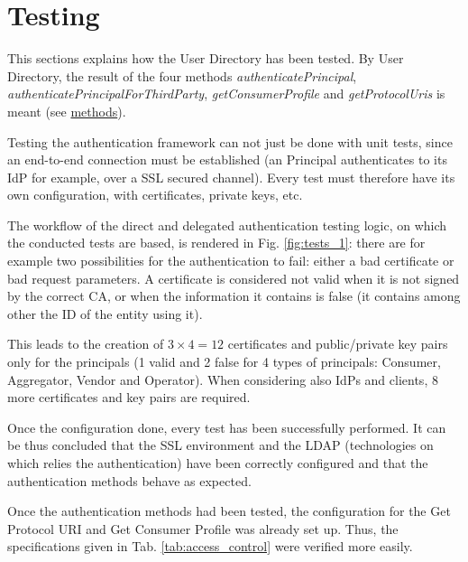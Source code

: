\section{Testing}
This sections explains how the User Directory has been tested. By User Directory, the result of the four methods \textit{authenticatePrincipal}, \textit{authenticatePrincipalForThirdParty}, \textit{getConsumerProfile} and \textit{getProtocolUris} is meant (see \hyperref[interface_methods]{methods}).

Testing the authentication framework can not just be done with unit tests, since an end-to-end connection must be established (an Principal authenticates to its IdP for example, over a SSL secured channel). Every test must therefore have its own configuration, with certificates, private keys, etc.

The workflow of the direct and delegated authentication testing logic, on which the conducted tests are based, is rendered in Fig. \ref{fig:tests_1}: there are for example two possibilities for the authentication to fail: either a bad certificate or bad request parameters. A certificate is considered not valid when it is not signed by the correct CA, or when the information it contains is false (it contains among other the ID of the entity using it). 

This leads to the creation of $ 3 \times 4 = 12 $ certificates and public/private key pairs only for the principals (1 valid and 2 false for 4 types of principals: Consumer, Aggregator, Vendor and Operator). When considering also IdPs and clients, 8 more certificates and key pairs are required. 

Once the configuration done, every test has been successfully performed. It can be thus concluded that the SSL environment and the LDAP (technologies on which relies the authentication) have been correctly configured and that the authentication methods behave as expected. 

Once the authentication methods had been tested, the configuration for the Get Protocol URI and Get Consumer Profile was already set up. Thus, the specifications given in Tab. \ref{tab:access_control} were verified more easily.

